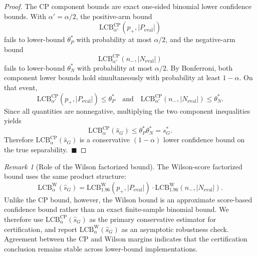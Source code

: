 \documentclass[conference]{IEEEtran}
\theoremstyle{remark}
\newtheorem{remark}{Remark}
\newcommand{\LCB}{\mathrm{LCB}}
\newcommand{\shat}{\hat{s}_G}
\newcommand{\pp}{p_{+}}
\newcommand{\nm}{n_{-}}
\begin{document}
\begin{proof}
The CP component bounds are exact one-sided binomial lower confidence bounds.
With $\alpha'=\alpha/2$, the positive-arm bound
\begin{equation}\label{eq:formula-35}
\LCB^{\mathrm{CP}}_{\alpha'}(\pp,|P_{\mathrm{eval}}|)
\end{equation}
fails to lower-bound $\theta_P^*$ with probability at most $\alpha/2$, and the
negative-arm bound
\begin{equation}\label{eq:formula-36}
\LCB^{\mathrm{CP}}_{\alpha'}(\nm,|N_{\mathrm{eval}}|)
\end{equation}
fails to lower-bound $\theta_N^*$ with probability at most $\alpha/2$.
By Bonferroni, both component lower bounds hold simultaneously with probability
at least $1-\alpha$.
On that event,
\begin{equation}\label{eq:formula-37}
\LCB^{\mathrm{CP}}_{\alpha'}(\pp,|P_{\mathrm{eval}}|)
\le \theta_P^*
\quad\text{and}\quad
\LCB^{\mathrm{CP}}_{\alpha'}(\nm,|N_{\mathrm{eval}}|)
\le \theta_N^* .
\end{equation}
Since all quantities are nonnegative, multiplying the two component inequalities
yields
\begin{equation}\label{eq:formula-38}
\LCB^{\mathrm{CP}}_{\alpha}(\shat)
\le
\theta_P^*\theta_N^*
=
s_G^* .
\end{equation}
Therefore $\LCB^{\mathrm{CP}}_{\alpha}(\shat)$ is a conservative
$(1-\alpha)$ lower confidence bound on the true separability.~$\blacksquare$
\end{proof}

\begin{remark}[Role of the Wilson factorized bound]
\label{rem:wilson_role}
The Wilson-score factorized bound uses the same product structure:
\begin{equation}\label{eq:formula-39}
\LCB^{\mathrm{W}}_{\alpha}(\shat)
=
\LCB^{\mathrm{W}}_{1.96}(\pp,|P_{\mathrm{eval}}|)
\cdot
\LCB^{\mathrm{W}}_{1.96}(\nm,|N_{\mathrm{eval}}|).
\end{equation}
Unlike the CP bound, however, the Wilson bound is an approximate score-based
confidence bound rather than an exact finite-sample binomial bound.
We therefore use $\LCB^{\mathrm{CP}}_{\alpha}(\shat)$ as the primary
conservative estimator for certification, and report
$\LCB^{\mathrm{W}}_{\alpha}(\shat)$ as an asymptotic robustness check.
Agreement between the CP and Wilson margins indicates that the certification
conclusion remains stable across lower-bound implementations.
\end{remark}
\end{document}
